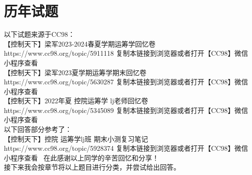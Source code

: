 \ifx\allfiles\undefined

	
	
\else
\fi
    \chapter{历年试题}
	以下试题来源于CC98：\\
	【控制天下】梁军2023-2024春夏学期运筹学回忆卷 https://www.cc98.org/topic/5911118 复制本链接到浏览器或者打开【CC98】微信小程序查看~\\
	【控制天下】梁军2023夏学期运筹学期末回忆卷 https://www.cc98.org/topic/5630287 复制本链接到浏览器或者打开【CC98】微信小程序查看~\\
	【控制天下】2022年夏 控院运筹学 lj老师回忆卷 https://www.cc98.org/topic/5345089 复制本链接到浏览器或者打开【CC98】微信小程序查看~\\
	以下回答部分参考了：\\
	【控制天下】控院 运筹学lj班 期末小测复习笔记 https://www.cc98.org/topic/5928374 复制本链接到浏览器或者打开【CC98】微信小程序查看~
	在此感谢以上同学的辛苦回忆和分享！\\
	接下来我会按章节将以上题目进行分类，并尝试给出回答。
